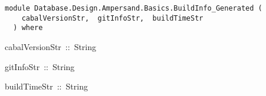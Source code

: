 \label{module:Database.Design.Ampersand.Basics.BuildInfo_Generated}
\haddockbeginheader
{\haddockverb\begin{verbatim}
module Database.Design.Ampersand.Basics.BuildInfo_Generated (
    cabalVersionStr,  gitInfoStr,  buildTimeStr
  ) where\end{verbatim}}
\haddockendheader

\begin{haddockdesc}
\item[
cabalVersionStr\ ::\ String
]
\item[
gitInfoStr\ ::\ String
]
\item[
buildTimeStr\ ::\ String
]
\end{haddockdesc}